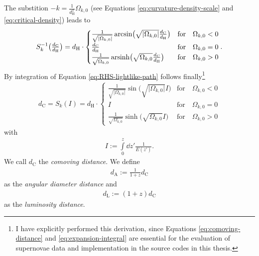 The substition $\displaystyle -k = \frac{1}{d_{\text{H}}^{2}}\Omega_{k,0}$ (see Equations \eqref{eq:curvature-density-scale} and \eqref{eq:critical-density}) leads to
\begin{align}
    S^{-1}_{k} \bigl( \tfrac{d_{\text{C}}}{d_{\text{H}}} \bigr) = d_{\text{H}} \cdot \begin{cases} 
                                                                                        \frac{1}{\sqrt{\vert \Omega_{k,0} \vert}} \arcsin \bigl(\sqrt{\vert \Omega_{k,0} \vert} \frac{d_{\text{C}}}{d_{\text{H}}} \bigr) &\text{for} \quad \Omega_{k,0} < 0  \\ 
                                                                                        \frac{d_{\text{C}}}{d_{\text{H}}} &\text{for} \quad \Omega_{k,0} = 0 \\ 
                                                                                        \frac{1}{\sqrt{\Omega_{k,0}}} \operatorname{arsinh} \bigl(\sqrt{\Omega_{k,0}} \frac{d_{\text{C}}}{d_{\text{H}}}\bigr) &\text{for} \quad \Omega_{k,0} > 0 
                                                                                                                                                                                               \end{cases}. \label{eq:LHS-lightlike-path}
\end{align}
By integration of Equation \eqref{eq:RHS-lightlike-path} follows finally\footnote{I have explicitly performed this derivation, since Equations \eqref{eq:comoving-distance} and \eqref{eq:expansion-integral} are essential for the evaluation of supernovae data and implementation in the source codes in this thesis.}
\begin{align}
    d_{\text{C}} = S_{k}(I) = d_{\text{H}} \cdot \begin{cases} 
                                                    \frac{1}{\sqrt{\vert \Omega_{k,0} \vert}} \sin \bigl(\sqrt{\vert \Omega_{k,0} \vert} I \bigr) &\text{for} \quad \Omega_{k,0} < 0 \\ 
                                                    I &\text{for} \quad \Omega_{k,0} = 0 \\  
                                                \frac{1}{\sqrt{\Omega_{k,0}}} \sinh \bigl(\sqrt{\Omega_{k,0}} I \bigr)  &\text{for} \quad \Omega_{k,0} > 0 
                                                \end{cases} \label{eq:comoving-distance} 
\end{align}
with 
\begin{align}
    I := \int\limits_{0}^{z} \dd{z'} \frac{1}{E(z')}. \label{eq:expansion-integral}  
\end{align}
We call $d_{\text{C}}$ the \textit{comoving distance}.
We define 
\begin{align}
    d_{\text{A}} := \frac{1}{1+z} d_{\text{C}} \label{eq:angular-diameter-distance}
\end{align}
as the \textit{angular diameter distance} and 
\begin{align}
    d_{\text{L}} := (1 + z) d_{\text{C}} \label{eq:luminosity-distance}
\end{align}
as the \textit{luminosity distance}.

